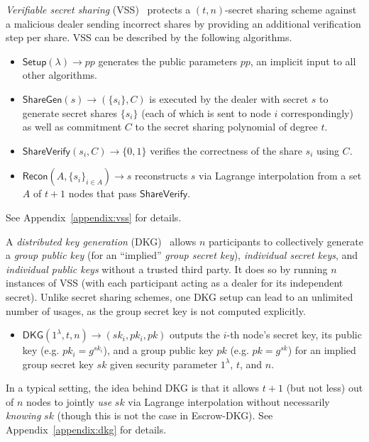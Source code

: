 \begin{definition}
\textit{Verifiable secret sharing} (VSS)~\cite{feldman1987practical, pedersen1991non} protects a $(t, n)$-secret sharing scheme against a malicious dealer sending incorrect shares by providing an additional verification step per share. VSS can be described by the following algorithms.
\begin{itemize}
    \item $\mathsf{Setup}(\lambda) \rightarrow pp$ generates the public parameters $pp$, an implicit input to all other algorithms.
    \item $\mathsf{ShareGen}(s) \rightarrow (\{s_i\}, C)$ is executed by the dealer with secret $s$ to generate secret shares $\{s_i\}$ (each of which is sent to node $i$ correspondingly) as well as commitment $C$ to the secret sharing polynomial of degree $t$.
    \item $\mathsf{ShareVerify}(s_i, C) \rightarrow \{0, 1\}$ verifies the correctness of the share $s_i$ using $C$.
    \item $\mathsf{Recon}(A, \{s_i\}_{i \in A}) \rightarrow s$ reconstructs $s$ via Lagrange interpolation from a set $A$ of $t + 1$ nodes that pass $\mathsf{ShareVerify}$.
\end{itemize}
See Appendix~\ref{appendix:vss} for details.
\end{definition}

\begin{definition}
\label{def:dkg}
A \textit{distributed key generation} (DKG)~\cite{pedersen1991threshold,gennaro1999secure} allows $n$ participants to collectively generate a \textit{group public key} (for an ``implied'' \textit{group secret key}), \textit{individual secret keys}, and \textit{individual public keys} without a trusted third party. It does so by running $n$ instances of VSS (with each participant acting as a dealer for its independent secret). Unlike secret sharing schemes, one DKG setup can lead to an unlimited number of usages, as the group secret key is not computed explicitly.
\begin{itemize}
    \item $\mathsf{DKG}(1^\lambda, t, n) \rightarrow (sk_i, pk_i, pk)$ outputs the $i$-th node's secret key, its public key (e.g. $pk_i = g^{sk_i}$), and a group public key $pk$ (e.g. $pk = g^{sk}$) for an implied group secret key $sk$ given security parameter $1^\lambda$, $t$, and $n$.
\end{itemize}
In a typical setting, the idea behind DKG is that it allows $t + 1$ (but not less) out of $n$ nodes to jointly \textit{use} $sk$ via Lagrange interpolation without necessarily \textit{knowing} $sk$ (though this is not the case in Escrow-DKG). See Appendix~\ref{appendix:dkg} for details.
\end{definition}

